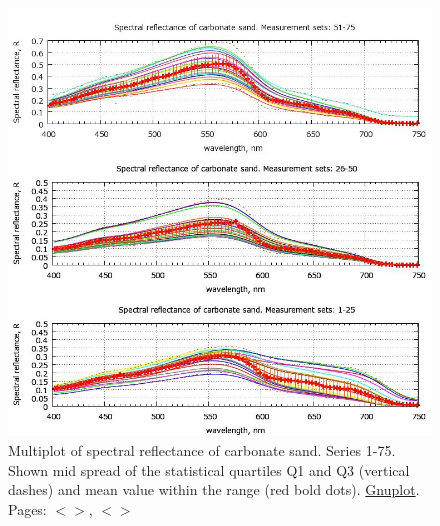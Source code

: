 \documentclass[11pt]{article}
\begin{document}
\begin{figure}[H]
	\begin{center}
		\includegraphics[scale=0.5]{GNU-16.jpg}
		\caption{Multiplot of spectral reflectance of carbonate sand. Series 1-75. Shown mid spread of the statistical quartiles Q1 and Q3 (vertical dashes) and	mean value within the range (red bold dots). \href{http://www.gnuplot.info/}{Gnuplot}. Pages: $<$\pageref{page-21}$>$, $<$\pageref{page-41}$>$­}
		\label{fig:4.14}
	\end{center}
\end{figure}
\end{document}
